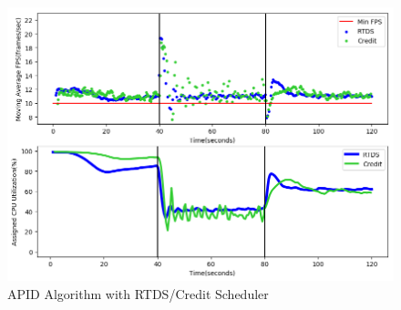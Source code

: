 \begin{itemize}
\begin{figure}[h!]
\centering
\includegraphics[width=1\linewidth]{images/1vm_apid}
\caption{APID Algorithm with RTDS/Credit Scheduler}
\label{1vm_apid}
\end{figure}



\end{itemize}
